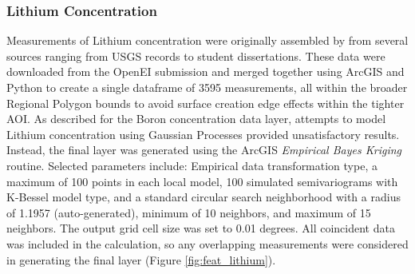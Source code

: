 \subsubsection{Lithium Concentration}

Measurements of Lithium concentration were originally assembled by \citet{bielicki_hydrogeolgic_2015} from several sources ranging from USGS records to student dissertations. These data were downloaded from the OpenEI submission \citep{kelley_geothermal_2015} and merged together using ArcGIS and Python to create a single dataframe of 3595 measurements, all within the broader Regional Polygon bounds to avoid surface creation edge effects within the tighter AOI. As described for the Boron concentration data layer, attempts to model Lithium concentration using Gaussian Processes provided unsatisfactory results. Instead, the final layer was generated using the ArcGIS \textit{Empirical Bayes Kriging} routine. Selected parameters include: Empirical data transformation type, a maximum of 100 points in each local model, 100 simulated semivariograms with K-Bessel model type, and a standard circular search neighborhood with a radius of 1.1957 (auto-generated), minimum of 10 neighbors, and maximum of 15 neighbors. The output grid cell size was set to 0.01 degrees. All coincident data was included in the calculation, so any overlapping measurements were considered in generating the final layer (Figure \ref{fig:feat_lithium}).

